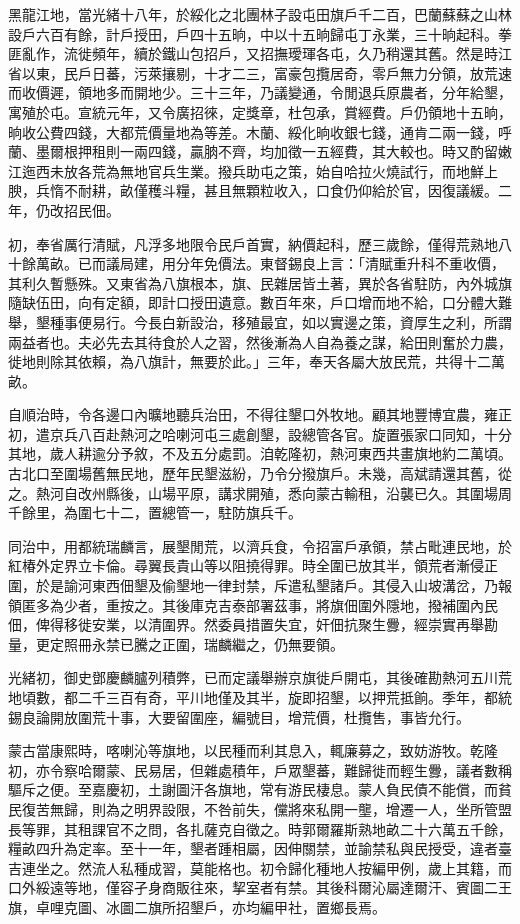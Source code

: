\begin{pinyinscope}
黑龍江地，當光緒十八年，於綏化之北團林子設屯田旗戶千二百，巴蘭蘇蘇之山林設戶六百有餘，計戶授田，戶四十五晌，中以十五晌歸屯丁永業，三十晌起科。拳匪亂作，流徙頻年，續於鐵山包招戶，又招撫璦琿各屯，久乃稍還其舊。然是時江省以東，民戶日蕃，污萊攘剔，十才二三，富豪包攬居奇，零戶無力分領，放荒速而收價遲，領地多而開地少。三十三年，乃議變通，令閒退兵原農者，分年給墾，寓殖於屯。宣統元年，又令廣招徠，定獎章，杜包承，賞經費。戶仍領地十五晌，晌收公費四錢，大都荒價量地為等差。木蘭、綏化晌收銀七錢，通肯二兩一錢，呼蘭、墨爾根押租則一兩四錢，贏朒不齊，均加徵一五經費，其大較也。時又酌留嫩江迤西未放各荒為無地官兵生業。撥兵助屯之策，始自哈拉火燒試行，而地鮮上腴，兵惰不耐耕，畝僅穫斗糧，甚且無顆粒收入，口食仍仰給於官，因復議緩。二年，仍改招民佃。

初，奉省厲行清賦，凡浮多地限令民戶首實，納價起科，歷三歲餘，僅得荒熟地八十餘萬畝。已而議局建，用分年免價法。東督錫良上言：「清賦重升科不重收價，其利久暫懸殊。又東省為八旗根本，旗、民雜居皆土著，異於各省駐防，內外城旗隨缺伍田，向有定額，即計口授田遺意。數百年來，戶口增而地不給，口分體大難舉，墾種事便易行。今長白新設治，移殖最宜，如以實邊之策，資厚生之利，所謂兩益者也。夫必先去其待食於人之習，然後漸為人自為養之謀，給田則奮於力農，徙地則除其依賴，為八旗計，無要於此。」三年，奉天各屬大放民荒，共得十二萬畝。

自順治時，令各邊口內曠地聽兵治田，不得往墾口外牧地。顧其地豐博宜農，雍正初，遣京兵八百赴熱河之哈喇河屯三處創墾，設總管各官。旋置張家口同知，十分其地，歲人耕逾分予敘，不及五分處罰。洎乾隆初，熱河東西共畫旗地約二萬頃。古北口至圍場舊無民地，歷年民墾滋紛，乃令分撥旗戶。未幾，高斌請還其舊，從之。熱河自改州縣後，山場平原，講求開殖，悉向蒙古輸租，沿襲已久。其圍場周千餘里，為圍七十二，置總管一，駐防旗兵千。

同治中，用都統瑞麟言，展墾閒荒，以濟兵食，令招富戶承領，禁占毗連民地，於紅椿外定界立卡倫。尋翼長貴山等以阻撓得罪。時全圍已放其半，領荒者漸侵正圍，於是諭河東西佃墾及偷墾地一律封禁，斥遣私墾諸戶。其侵入山坡溝岔，乃報領匿多為少者，重按之。其後庫克吉泰部署茲事，將旗佃圍外隱地，撥補圍內民佃，俾得移徙安業，以清圍界。然委員措置失宜，奸佃抗聚生釁，經崇實再舉勘量，更定照冊永禁已騰之正圍，瑞麟繼之，仍無要領。

光緒初，御史鄧慶麟臚列積弊，已而定議舉辦京旗徙戶開屯，其後確勘熱河五川荒地頃數，都二千三百有奇，平川地僅及其半，旋即招墾，以押荒抵餉。季年，都統錫良論開放圍荒十事，大要留圍座，編號目，增荒價，杜攬售，事皆允行。

蒙古當康熙時，喀喇沁等旗地，以民種而利其息入，輒廉募之，致妨游牧。乾隆初，亦令察哈爾蒙、民易居，但雜處積年，戶眾墾蕃，難歸徙而輕生釁，議者數稱驅斥之便。至嘉慶初，土謝圖汗各旗地，常有游民棲息。蒙人負民債不能償，而貧民復苦無歸，則為之明界設限，不咎前失，儻將來私開一壟，增遷一人，坐所管盟長等罪，其租課官不之問，各扎薩克自徵之。時郭爾羅斯熟地畝二十六萬五千餘，糧畝四升為定率。至十一年，墾者踵相屬，因伸關禁，並諭禁私與民授受，違者臺吉連坐之。然流人私種成習，莫能格也。初令歸化種地人按編甲例，歲上其籍，而口外綏遠等地，僅容孑身商販往來，挈室者有禁。其後科爾沁屬達爾汗、賓圖二王旗，卓哩克圖、冰圖二旗所招墾戶，亦均編甲社，置鄉長焉。


\end{pinyinscope}
